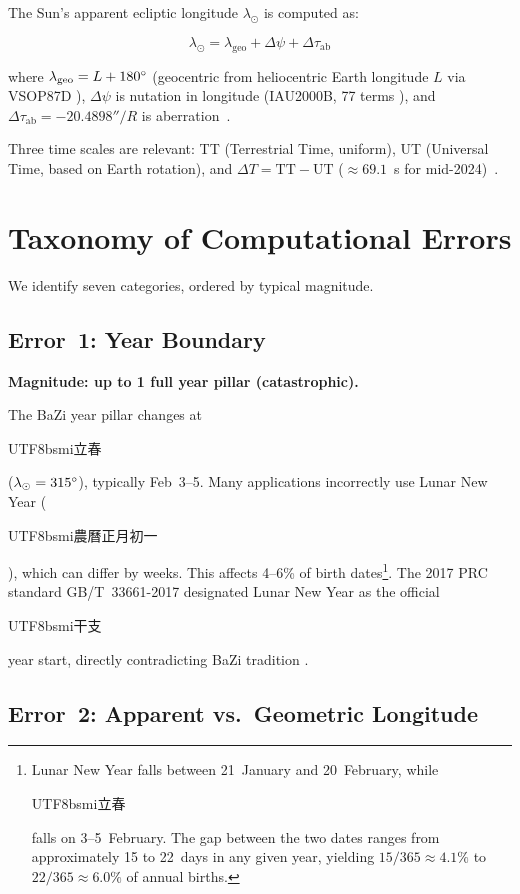 \documentclass[10pt,a4paper]{article}
\newcommand{\zh}[1]{\begin{CJK}{UTF8}{bsmi}#1\end{CJK}}
\begin{document}
The Sun's apparent ecliptic longitude $\lambda_\odot$ is computed as:

\begin{equation}
  \lambda_\odot = \lambda_{\text{geo}} + \Delta\psi + \Delta\tau_{\text{ab}}
  \label{eq:apparent}
\end{equation}

\noindent where $\lambda_{\text{geo}} = L + 180\degree$ (geocentric from
heliocentric Earth longitude $L$ via VSOP87D \cite{bretagnon1988}),
$\Delta\psi$ is nutation in longitude (IAU2000B, 77 terms \cite{iau2000b}),
and $\Delta\tau_{\text{ab}} = -20.4898'' / R$ is aberration~\cite{ronvondrak1986}.

Three time scales are relevant: TT (Terrestrial Time, uniform), UT (Universal
Time, based on Earth rotation), and $\Delta T = \text{TT} - \text{UT}$
($\approx 69.1$~s for mid-2024)~\cite{nasa_deltaT_uncertainty, stephenson2016}.

\section{Taxonomy of Computational Errors}
\label{sec:errors}

We identify seven categories, ordered by typical magnitude.

\subsection{Error~1: Year Boundary}
\label{subsec:error_lichun}

\textbf{Magnitude: up to 1 full year pillar (catastrophic).}

The BaZi year pillar changes at \zh{立春} ($\lambda_\odot = 315\degree$),
typically Feb~3--5. Many applications incorrectly use Lunar New Year
(\zh{農曆正月初一}), which can differ by weeks. This affects 4--6\% of birth
dates\footnote{Lunar New Year falls between 21~January and 20~February,
while \zh{立春} falls on 3--5~February. The gap between the two dates
ranges from approximately 15 to 22~days in any given year, yielding
$15/365 \approx 4.1\%$ to $22/365 \approx 6.0\%$ of annual births.}. The 2017 PRC standard GB/T~33661-2017 designated Lunar New Year as the
official \zh{干支} year start, directly contradicting BaZi tradition
\cite{gbstandard2017}.

\subsection{Error~2: Apparent vs.\ Geometric Longitude}
\end{document}
